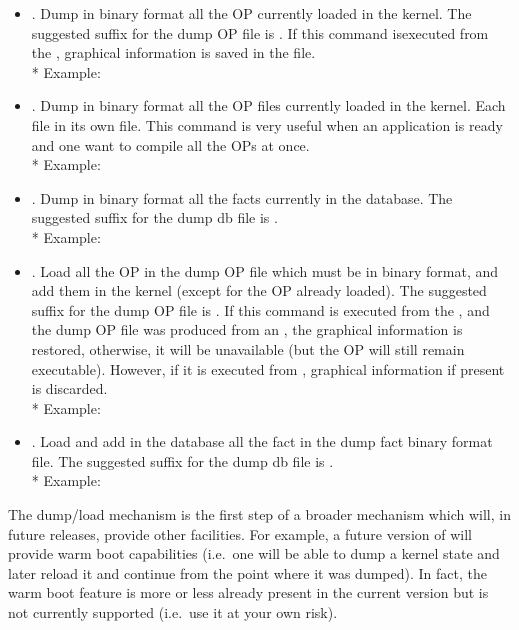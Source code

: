 \begin{itemize}

\item {}.  Dump in binary format all the OP
currently loaded in the kernel. The suggested suffix for the dump OP file is
. If this command isexecuted from the \XPK{}, graphical information
is saved in the file.\\* 
Example: 

\item {}.  Dump in binary format all the OP files
currently loaded in the kernel. Each file in its own  file. This 
command is very useful when an application is ready and one want to compile
all the OPs at once.\\* 
Example: 

\item {}.  Dump in binary format all the facts
currently in the database. The suggested suffix for the dump db file is
.\\* 
Example: 

\item {}.  Load all the OP in the dump OP
file which must be in binary format, and add them in the kernel (except for the
OP already loaded). The suggested suffix for the dump OP file is .
If this command is executed from the \XPK{}, and the dump OP file was produced
from an \XPK{}, the graphical information is restored, otherwise, it will be
unavailable (but the OP will still remain executable).  However, if it is
executed from \aCPK{}, graphical information if present is discarded. \\*
Example: 

\item {}.  Load and add in the database all
the fact in the dump fact binary format file. The suggested suffix for the dump
db file is .\\* 
Example: 

\end{itemize}

The dump/load mechanism is the first step of a broader mechanism which will, in
future releases, provide other facilities. For example, a future version of
\COPRS{} will provide warm boot capabilities (i.e.\ one will be able to dump a
kernel state and later reload it and continue from the point where it was
dumped). In fact, the warm boot feature is more or less already present in the
current version but is not currently supported (i.e.\ use it at your own risk).


